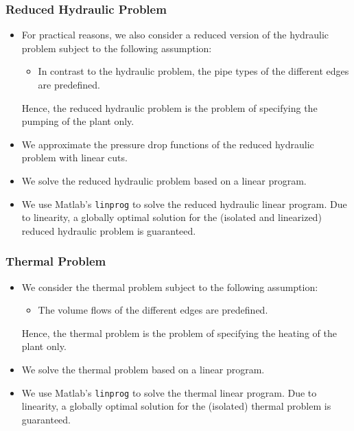 \documentclass[a4paper,10pt]{article}
\begin{document}
\subsubsection{Reduced Hydraulic Problem}
\begin{itemize}
  \item For practical reasons, we also consider a reduced version of the hydraulic problem subject to the following assumption:
  \begin{itemize}
    \item In contrast to the hydraulic problem, the pipe types of the different edges are predefined.
  \end{itemize}
  Hence, the reduced hydraulic problem is the problem of specifying the pumping of the plant only.
  \item We approximate the pressure drop functions of the reduced hydraulic problem with linear cuts.
  \item We solve the reduced hydraulic problem based on a linear program.
  \item We use Matlab's \texttt{linprog} to solve the reduced hydraulic linear program.
  Due to linearity, a globally optimal solution for the (isolated and linearized) reduced hydraulic problem is guaranteed.
\end{itemize}
\subsubsection{Thermal Problem}
\begin{itemize}
  \item We consider the thermal problem subject to the following assumption:
  \begin{itemize}
    \item The volume flows of the different edges are predefined.
  \end{itemize}
  Hence, the thermal problem is the problem of specifying the heating of the plant only.
  \item We solve the thermal problem based on a linear program.
  \item We use Matlab's \texttt{linprog} to solve the thermal linear program.
  Due to linearity, a globally optimal solution for the (isolated) thermal problem is guaranteed.
\end{itemize}
\end{document}

